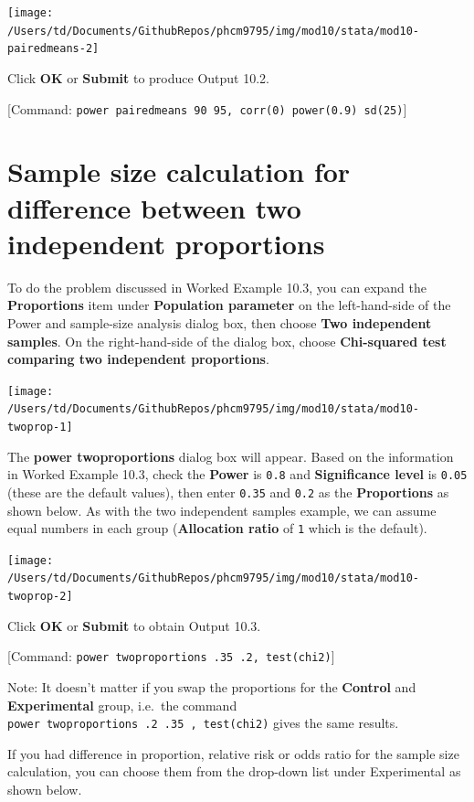 \documentclass[
]{memoir}
\begin{document}
\texttt{[image: /Users/td/Documents/GithubRepos/phcm9795/img/mod10/stata/mod10-pairedmeans-2]}

Click \textbf{OK} or \textbf{Submit} to produce Output 10.2.

{[}Command: \texttt{power\ pairedmeans\ 90\ 95,\ corr(0)\ power(0.9)\ sd(25)}{]}

\hypertarget{sample-size-calculation-for-difference-between-two-independent-proportions}{%
\section{Sample size calculation for difference between two independent proportions}\label{sample-size-calculation-for-difference-between-two-independent-proportions}}

To do the problem discussed in Worked Example 10.3, you can expand the \textbf{Proportions} item under \textbf{Population parameter} on the left-hand-side of the Power and sample-size analysis dialog box, then choose \textbf{Two independent samples}. On the right-hand-side of the dialog box, choose \textbf{Chi-squared test comparing two independent proportions}.

\texttt{[image: /Users/td/Documents/GithubRepos/phcm9795/img/mod10/stata/mod10-twoprop-1]}

The \textbf{power twoproportions} dialog box will appear. Based on the information in Worked Example 10.3, check the \textbf{Power} is \texttt{0.8} and \textbf{Significance level} is \texttt{0.05} (these are the default values), then enter \texttt{0.35} and \texttt{0.2} as the \textbf{Proportions} as shown below. As with the two independent samples example, we can assume equal numbers in each group (\textbf{Allocation ratio} of \texttt{1} which is the default).

\texttt{[image: /Users/td/Documents/GithubRepos/phcm9795/img/mod10/stata/mod10-twoprop-2]}

Click \textbf{OK} or \textbf{Submit} to obtain Output 10.3.

{[}Command: \texttt{power\ twoproportions\ .35\ .2,\ test(chi2)}{]}

Note: It doesn't matter if you swap the proportions for the \textbf{Control} and \textbf{Experimental} group, i.e.~the command \texttt{power\ twoproportions\ .2\ .35\ ,\ test(chi2)} gives the same results.

If you had difference in proportion, relative risk or odds ratio for the sample size calculation, you can choose them from the drop-down list under Experimental as shown below.
\end{document}
